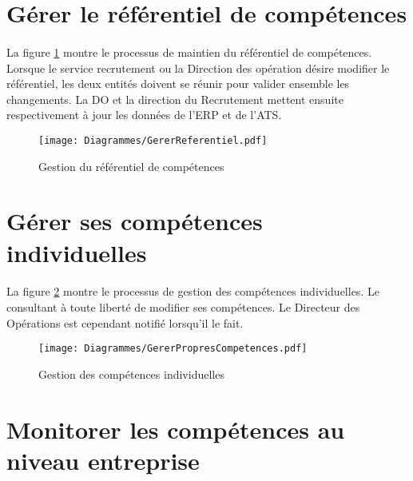 \section{Gérer le référentiel de compétences}

\paragraph{} La figure \ref{gestionReferentiel} montre le processus de maintien du référentiel de compétences. Lorsque le service recrutement ou la Direction des opération désire modifier le référentiel, les deux entités doivent se réunir pour valider ensemble les changements. La DO et la direction du Recrutement mettent ensuite 
respectivement à jour les données de l'ERP et de l'ATS.

\begin{figure}
	\centering
	\texttt{[image: Diagrammes/GererReferentiel.pdf]}
	\caption{Gestion du référentiel de compétences}
	\label{gestionReferentiel}
\end{figure}


\section{Gérer ses compétences individuelles}


\paragraph{} La figure \ref{gestionCompIndiv} montre le processus de gestion des compétences individuelles. Le consultant à toute liberté de modifier ses compétences. Le Directeur des Opérations est cependant notifié lorsqu'il le fait.

\begin{figure}
	\centering
	\texttt{[image: Diagrammes/GererPropresCompetences.pdf]}
	\caption{Gestion des compétences individuelles}
	\label{gestionCompIndiv}
\end{figure}


\section{Monitorer les compétences au niveau entreprise}

